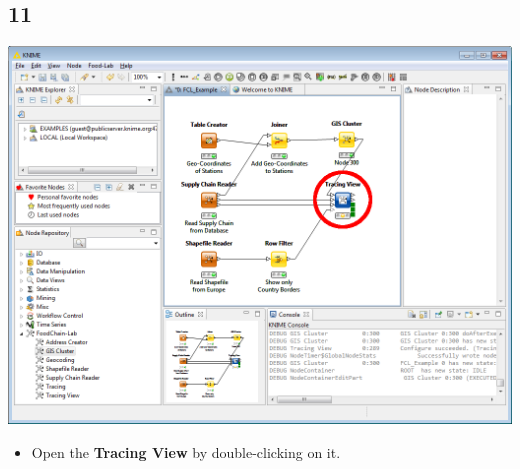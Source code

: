\documentclass{beamer}
\begin{document}
\subsection{11}
\begin{frame}
	\begin{center}
  		\includegraphics[height=0.6\textheight]{11.png}
	\end{center}
	\begin{itemize}
		\item Open the \textbf{Tracing View} by double-clicking on it.
	\end{itemize}
\end{frame}
\end{document}
